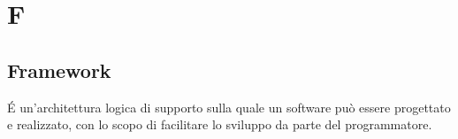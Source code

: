 \section{F}
\subsection{Framework}%
É un'architettura logica di supporto sulla quale un software può essere progettato e realizzato, con lo scopo di facilitare lo sviluppo da parte del programmatore.
\clearpage